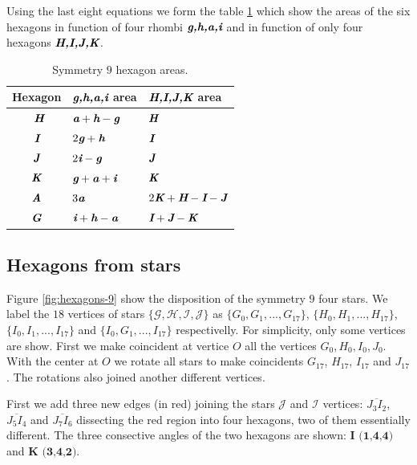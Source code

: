 \documentclass[11pt]{article}
\def\mathbi#1{\textbf{\em #1}}
\begin{document}
Using the last eight equations we form the table \ref{tbl:hexagons-areas} which show the areas of the six hexagons in function of four rhombi $\mathbi{g,h,a,i}$ and in function of only four hexagons $\mathbi{H,I,J,K}$.

\begin{table}[H]
\begin{center}
\begin{tabular}{| c | l | l |}
\hline
Hexagon & $\mathbi{g,h,a,i}$ area & $\mathbi{H,I,J,K}$ area \\ \hline\
$\mathbi{H}$ & $\mathbi{a} + \mathbi{h} - \mathbi{g}$ & $\mathbi{H}$ \\[0.5ex]
$\mathbi{I}$ & $2\mathbi{g} + \mathbi{h}$ & $\mathbi{I}$ \\[0.5ex]
$\mathbi{J}$ & $2\mathbi{i} - \mathbi{g}$ & $\mathbi{J}$ \\[0.5ex]
$\mathbi{K}$ & $\mathbi{g} + \mathbi{a} + \mathbi{i}$ & $\mathbi{K}$ \\[0.5ex]
\hline
$\mathbi{A}$ & $3\mathbi{a}$ & $2\mathbi{K} + \mathbi{H} - \mathbi{I} - \mathbi{J}$ \\[0.5ex]
$\mathbi{G}$ & $\mathbi{i} + \mathbi{h} - \mathbi{a}$ & $\mathbi{I} + \mathbi{J} - \mathbi{K}$ \\[0.5ex]
\hline
\end{tabular}
\caption{Symmetry $9$ hexagon areas.} 
\label{tbl:hexagons-areas}
\end{center}
\end{table}


\subsection{Hexagons from stars}

Figure \ref{fig:hexagons-9} show the disposition of the symmetry $9$ four stars. We label the $18$ vertices of stars $\{\mathcal{G},\mathcal{H},\mathcal{I},\mathcal{J}\}$ as
 $\{G_0,G_1,...,G_{17}\}$,
 $\{H_0,H_1,...,H_{17}\}$,
 $\{I_0,I_1,...,I_{17}\}$ and
 $\{I_0,G_1,...,I_{17}\}$ respectivelly. 
For simplicity, only some vertices are show. First we make coincident at vertice $O$ all the vertices $G_0,H_0,I_0,J_0$. With the center at $O$ we rotate all stars to make coincidents
$G_{17}$, $H_{17}$, $I_{17}$ and $J_{17}$. The rotations also joined another different vertices.

First we add three new edges (in red) joining the stars $\mathcal{J}$ and $\mathcal{I}$ vertices: $\overline{J_3I_2}$, $\overline{J_5I_4}$ and $\overline{J_7I_6}$ dissecting the red region into four hexagons, two of them essentially different. The three consective angles of the two hexagons are shown: $\textbf{I (1,4,4)}$ and $\textbf{K (3,4,2)}$.
\end{document}
